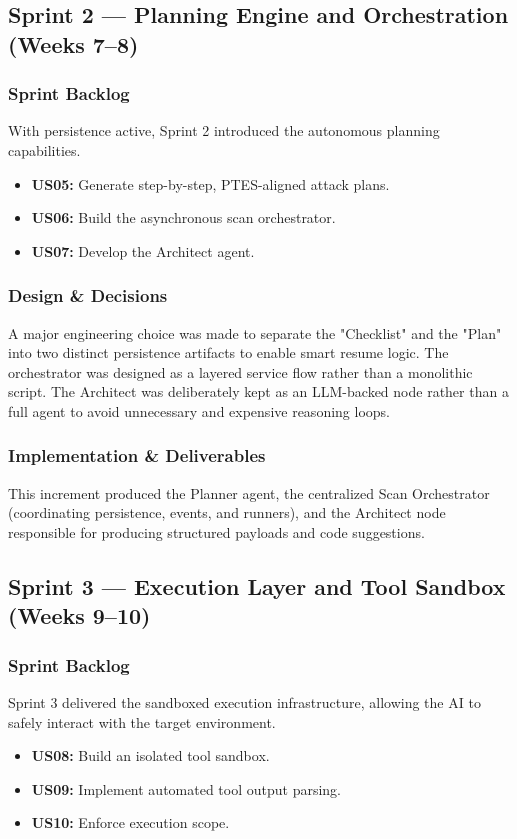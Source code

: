 \documentclass[12pt,a4paper]{report}
\begin{document}
\subsection{Sprint 2 --- Planning Engine and Orchestration (Weeks 7--8)}

\subsubsection{Sprint Backlog}
With persistence active, Sprint 2 introduced the autonomous planning capabilities.
\begin{itemize}
    \item \textbf{US05:} Generate step-by-step, PTES-aligned attack plans.
    \item \textbf{US06:} Build the asynchronous scan orchestrator.
    \item \textbf{US07:} Develop the Architect agent.
\end{itemize}

\subsubsection{Design \& Decisions}
A major engineering choice was made to separate the "Checklist" and the "Plan" into two distinct persistence artifacts to enable smart resume logic. The orchestrator was designed as a layered service flow rather than a monolithic script. The Architect was deliberately kept as an LLM-backed node rather than a full agent to avoid unnecessary and expensive reasoning loops.

\subsubsection{Implementation \& Deliverables}
This increment produced the Planner agent, the centralized Scan Orchestrator (coordinating persistence, events, and runners), and the Architect node responsible for producing structured payloads and code suggestions.

\subsection{Sprint 3 --- Execution Layer and Tool Sandbox (Weeks 9--10)}

\subsubsection{Sprint Backlog}
Sprint 3 delivered the sandboxed execution infrastructure, allowing the AI to safely interact with the target environment.
\begin{itemize}
    \item \textbf{US08:} Build an isolated tool sandbox.
    \item \textbf{US09:} Implement automated tool output parsing.
    \item \textbf{US10:} Enforce execution scope.
\end{itemize}
\end{document}
